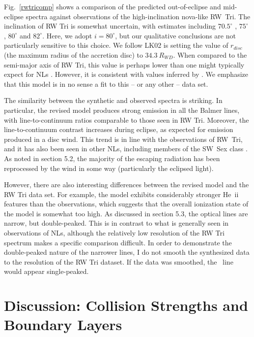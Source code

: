 Fig.~\ref{rwtricomp} shows a comparison of the predicted
out-of-eclipse and mid-eclipse spectra against observations of the
high-inclination nova-like RW~Tri. The inclination of RW Tri is
somewhat uncertain, with estimates including $70.5^\circ$
\citep{smak1995}, $75^\circ$ \citep{groot2004}, $80^\circ$
\citep{longmore1981} and $82^\circ$\citep{frankking1981}. Here, we
adopt $i = 80^\circ$, but our qualitative conclusions are not
particularly sensitive to this choice. 
We follow LK02 is setting the value of $r_{disc}$ (the maximum radius of the accretion disc)
to $34.3~R_{WD}$. When compared to the semi-major axis of RW Tri,
this value is perhaps lower than one might 
typically expect for NLs \citep{harropallinwarner1996}. 
However, it is consistent
with values inferred by \cite{rutten1992}.
We emphasize that this model is in no sense a fit to this -- or any other -- data set.


The similarity between the synthetic and observed spectra is
striking. In particular, the revised model produces strong emission in
all the Balmer lines, with line-to-continuum ratios comparable to
those seen in RW Tri. Moreover, the line-to-continuum contrast
increases during eclipse, as expected for emission produced in a disc
wind. This trend is in line with the observations of RW~Tri, and it
has also been seen in other NLs, including members of the SW~Sex class
\citep{neustroev2011}. As noted in section 5.2, the majority
of the escaping radiation has been reprocessed by the wind in some way
(particularly the eclipsed light).

However, there are also interesting differences between the revised
model and the RW Tri data set. For example, the model exhibits
considerably stronger He~{\sc ii} features than the observations,
which suggests that the overall ionization state of the model is
somewhat too high. As discussed in section 5.3, the optical lines are
narrow, but double-peaked. 
This is in contrast to what is generally seen in observations
of NLs, although the relatively low resolution of the RW Tri
spectrum makes a specific comparison difficult. In order to demonstrate
the double-peaked nature of the narrower lines, I do not 
smooth the synthesized data to the resolution of the RW Tri dataset.
If the data was smoothed, the \ha\ line would appear single-peaked.

\section{Discussion: Collision Strengths and Boundary Layers}
\label{sec:coll_bl}

